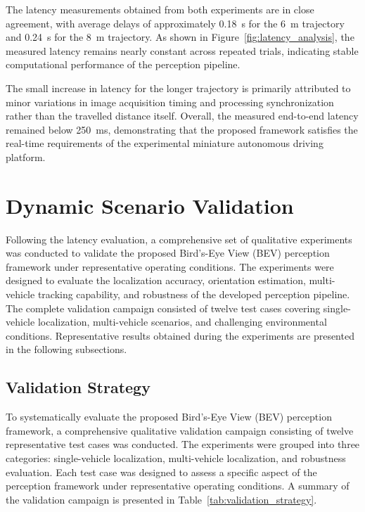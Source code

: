 The latency measurements obtained from both experiments are in close agreement, with average delays of approximately \SI{0.18}{s} for the 6~m trajectory and \SI{0.24}{s} for the 8~m trajectory. As shown in Figure~\ref{fig:latency_analysis}, the measured latency remains nearly constant across repeated trials, indicating stable computational performance of the perception pipeline.

The small increase in latency for the longer trajectory is primarily attributed to minor variations in image acquisition timing and processing synchronization rather than the travelled distance itself. Overall, the measured end-to-end latency remained below \SI{250}{ms}, demonstrating that the proposed framework satisfies the real-time requirements of the experimental miniature autonomous driving platform.

\section{Dynamic Scenario Validation}

Following the latency evaluation, a comprehensive set of qualitative experiments was conducted to validate the proposed Bird's-Eye View (BEV) perception framework under representative operating conditions. The experiments were designed to evaluate the localization accuracy, orientation estimation, multi-vehicle tracking capability, and robustness of the developed perception pipeline. The complete validation campaign consisted of twelve test cases covering single-vehicle localization, multi-vehicle scenarios, and challenging environmental conditions. Representative results obtained during the experiments are presented in the following subsections.

\subsection{Validation Strategy}

To systematically evaluate the proposed Bird's-Eye View (BEV) perception framework, a comprehensive qualitative validation campaign consisting of twelve representative test cases was conducted. The experiments were grouped into three categories: single-vehicle localization, multi-vehicle localization, and robustness evaluation. Each test case was designed to assess a specific aspect of the perception framework under representative operating conditions. A summary of the validation campaign is presented in Table~\ref{tab:validation_strategy}.

